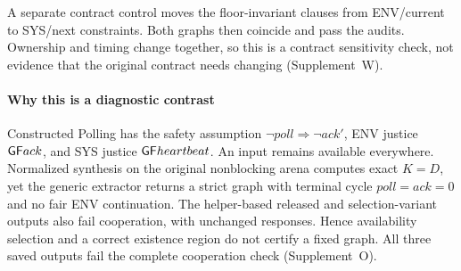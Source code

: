 A separate contract control moves the floor-invariant clauses from
ENV/current to SYS/next constraints. Both graphs then coincide and pass
the audits. Ownership and timing change together, so this is a contract
sensitivity check, not evidence that the original contract needs changing
(Supplement~W).

\paragraph{Why this is a diagnostic contrast}
Constructed Polling has the safety assumption
$\neg poll\Rightarrow\neg ack'$, ENV justice $\mathsf{G}\mathsf{F} ack$, and SYS
justice $\mathsf{G}\mathsf{F} heartbeat$. An input remains available everywhere.
Normalized synthesis on the original nonblocking arena computes exact
$K=D$, yet the generic extractor returns a strict graph with terminal
cycle $poll=ack=0$ and no fair ENV continuation. The helper-based
released and selection-variant outputs also fail cooperation, with
unchanged responses. Hence availability selection and a correct existence
region do not certify a fixed graph. All three saved outputs fail the
complete cooperation check (Supplement~O).

